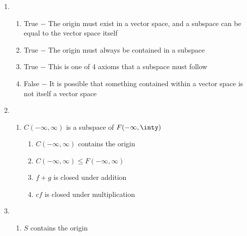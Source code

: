 \documentclass[12pt]{article}
\begin{document}
\begin{enumerate}
  \item 

    \begin{enumerate}

      \item True $-$ The origin must exist in a vector space, and a subspace can be equal to the vector space itself

      \item True $-$ The origin must always be contained in a subspace

      \item True $-$ This is one of 4 axioms that a subspace must follow

      \item False $-$ It is possible that something contained within a vector space is not itself a vector space

    \end{enumerate}

    \setcounter{enumi}{46}

  \item

    \begin{enumerate}

      \item $C(-\infty,\infty)$ is a subspace of $F(-\infty,\inty)$

        \begin{enumerate}

          \item $C(-\infty,\infty)$ contains the origin \textcolor{green}{\checkmark}

          \item $C(-\infty,\infty)\leq F(-\infty,\infty)$ \textcolor{green}{\checkmark}

      \item $f+g$ is closed under addition \textcolor{green}{\checkmark}

      \item $cf$ is closed under multiplication \textcolor{green}{\checkmark}

    \end{enumerate}

    \end{enumerate}

  \item

    \begin{enumerate}

      \item $S$ contains the origin \textcolor{green}{\checkmark}


\end{enumerate}
\end{enumerate}
\end{document}

